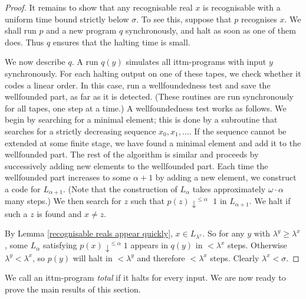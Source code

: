 \documentclass[a4paper,11pt]{amsart}
\theoremstyle{definition}
\newtheorem*{problem A}{Problem 1}
\newtheorem*{problem B}{Problem 2}
\theoremstyle{remark}
\begin{document}
\begin{proof}
It remains to show that any recognisable real $x$ is recognisable with a uniform time bound strictly below $\sigma$.
To see this, suppose that $p$ recognises $x$. 
We shall run $p$ and a new program $q$ synchronously, and halt as soon as one of them does. 
Thus $q$ ensures that the halting time is small. 

We now describe $q$. 
A run 
$q(y)$ simulates all ittm-programs with input $y$ synchronously. 
For each halting output on one of these tapes, we check whether it codes a linear order. 
In this case, run a wellfoundedness test and save the wellfounded part, as far as it is detected. 
(These routines are run synchronously for all tapes, one step at a time.) 
A wellfoundedness test works as follows. 
We begin by searching for a minimal element; this is done by a subroutine that searches for a strictly decreasing sequence $x_0, x_1, \dots$.
If the sequence cannot be extended at some finite stage, we have found a minimal element and add it to the wellfounded part. 
The rest of the algorithm is similar and proceeds by successively adding new elements to the wellfounded part. 
Each time the wellfounded part increases to some $\alpha+1$ by adding a new element, 
we construct a code for $L_{\alpha+1}$. 
(Note that the construction of $L_\alpha$ takes approximately $\omega\cdot \alpha$ many steps.) 
We then search for $z$ such that $p(z){\downarrow}^{\leq\alpha}$
$1$ in $L_{\alpha+1}$. 
We halt if such a $z$ is found and $x\neq z$. 

By Lemma \ref{recognisable reals appear quickly}, $x\in L_{\lambda^x}$. 
So for any $y$ with $\lambda^y\geq\lambda^x$, some $L_\alpha$ satisfying \emph{$p(x){\downarrow}^{\leq\alpha} 1$} appears in $q(y)$ in ${<}\lambda^x$ steps. 
Otherwise $\lambda^y<\lambda^x$, so $p(y)$ will halt in ${<}\lambda^y$ and therefore ${<}\lambda^x$ steps. 
Clearly 
$\lambda^x<\sigma$. 
\end{proof} 


We call an ittm-program \emph{total} if it halts for every input. 
We are now ready to prove the main results of this section.
\end{document}

